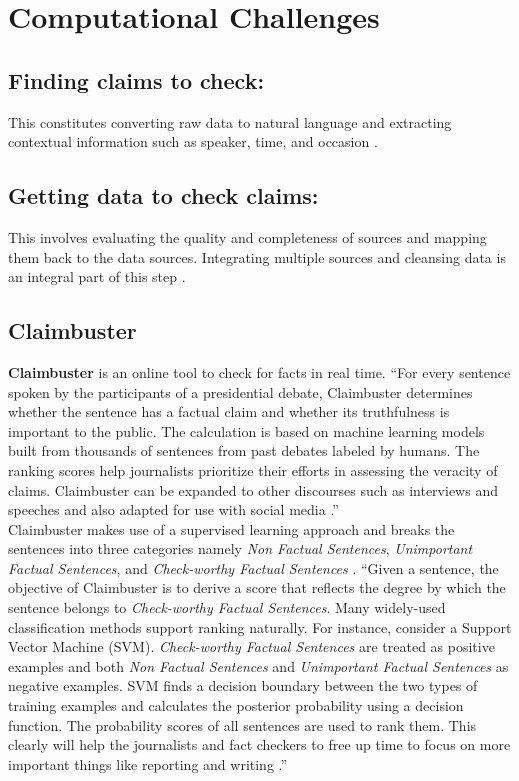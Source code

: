 \documentclass[sigconf]{acmart}
\begin{document}
\section{Computational Challenges} 
\subsection{Finding claims to check:} This constitutes converting raw data to natural language and extracting contextual information such as speaker, time, and occasion \cite{Hassan2015}.
\subsection{Getting data to check claims:} This involves evaluating the quality and completeness of sources and mapping them back to the data sources. Integrating multiple sources and cleansing data is an integral part of this step \cite{Hassan2015}.

\subsection{Claimbuster}
\textbf{Claimbuster} is an online tool to check for facts in real time. ``For every sentence spoken by the participants of a presidential debate, Claimbuster determines whether the sentence has a factual claim and whether its truthfulness is important to the public. The calculation is based on machine learning models built from thousands of sentences from past debates labeled by humans. The ranking scores help journalists prioritize their efforts in assessing the veracity of claims. Claimbuster can be expanded to other discourses such as interviews and speeches and also adapted for use with social media \cite{Hassan2015}.'' \\
Claimbuster makes use of a supervised learning approach and breaks the sentences into three categories namely \textit{Non Factual Sentences}, \textit{Unimportant Factual Sentences}, and \textit{Check-worthy Factual Sentences} \cite{Hassan2015}. ``Given a sentence, the objective of Claimbuster is to derive a score that reflects the degree by which the sentence belongs to \textit{Check-worthy Factual Sentences}. Many widely-used classification methods support ranking naturally. For instance, consider a Support Vector Machine (SVM). \textit{Check-worthy Factual Sentences} are treated as positive examples and both \textit{Non Factual Sentences} and \textit{Unimportant Factual Sentences} as negative examples. SVM finds a decision boundary between the two types of training examples and calculates the posterior probability using a decision function. The probability scores of all sentences are used to rank them. This clearly will help the journalists and fact checkers to free up time to focus on more important things like reporting and writing \cite{Hassan2015}.''
\end{document}
